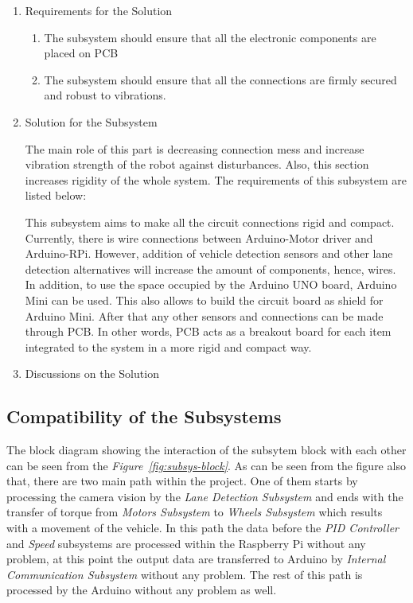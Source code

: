 \documentclass[a4paper,12pt]{article}
\begin{document}
\begin{enumerate}

\item {Requirements for the Solution}


\begin{enumerate}

\item The subsystem should ensure that all the electronic components are placed on PCB

\item The subsystem should ensure that all the connections are firmly secured and robust to vibrations.

\end{enumerate} 


\item {Solution for the Subsystem}


The main role of this part is decreasing connection mess and increase vibration strength of the robot against disturbances. Also, this section increases rigidity of the whole system. The requirements of this subsystem are listed below:	


This subsystem aims to make all the circuit connections rigid and compact. Currently, there is wire connections between Arduino-Motor driver and Arduino-RPi. However, addition of vehicle detection sensors and other lane detection alternatives will increase the amount of components, hence, wires. In addition, to use the space occupied by the Arduino UNO board, Arduino Mini can be used. This also allows to build the circuit board as shield for Arduino Mini. After that any other sensors and connections can be made through PCB. In other words, PCB acts as a breakout board for each item integrated to the system in a more rigid and compact way.


\item {Discussions on the Solution}


\end{enumerate}	




\subsection{Compatibility of the Subsystems}



The block diagram showing the interaction of the subsytem block with each other can be seen from the \textit{Figure~\ref{fig:subsys-block}}. As can be seen from the figure also that, there are two main path within the project. One of them starts by processing the camera vision by the \textit{Lane Detection Subsystem} and ends with the transfer of torque from \textit{Motors Subsystem} to \textit{Wheels Subsystem} which results with a movement of the vehicle. In this path the data before the \textit{PID Controller} and \textit{Speed} subsystems are processed within the Raspberry Pi without any problem, at this point the output data are transferred to Arduino by \textit{Internal Communication Subsystem} without any problem. The rest of this path is processed by the Arduino without any problem as well.
\end{document}
